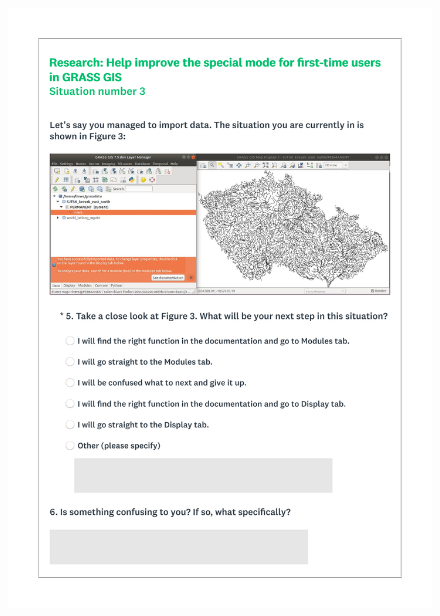 \documentclass[a4paper,10pt,twoside]{article}
\begin{document}
 \newpage
 \begin{figure}[hbt!]
 \begin{center}
 \includegraphics[width=15.5cm]{../surveys/questionnaires/survey2-page5_questions5_6.pdf}
 \end{center}
 \end{figure}
 
\end{document}
